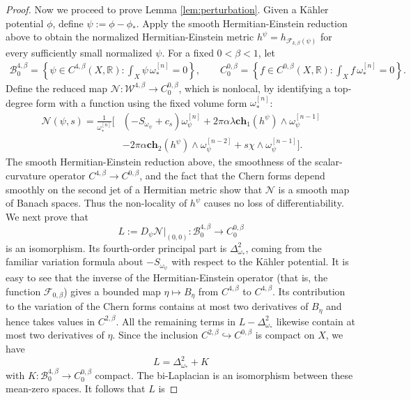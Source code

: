 \documentclass[10pt, letterpaper]{amsart}
\theoremstyle{plain}
\theoremstyle{definition}
\numberwithin{equation}{section}
\begin{document}
\begin{proof}
\indent Now we proceed to prove Lemma \ref{lem:perturbation}. Given a K\"ahler potential $\phi$, define $\psi:=\phi-\phi_*$.  Apply the smooth Hermitian-Einstein reduction above to obtain
the normalized Hermitian-Einstein metric $h^\psi=h_{\mathcal F_{k,\beta}(\psi)}$ for every sufficiently
small normalized $\psi$. For a fixed $0<\beta<1$, let
\begin{align*}
\mathcal B_0^{4,\beta}
=
\left\{\psi\in C^{4,\beta}(X,\mathbb R):
\int_X\psi\,\omega_*^{[n]}=0\right\},
\qquad
C_0^{0,\beta}
=
\left\{f\in C^{0,\beta}(X,\mathbb R):
\int_Xf\,\omega_*^{[n]}=0\right\}.
\end{align*}
Define the reduced map $\mathcal N: \mathcal{W}^{4,\beta} \rightarrow C_0^{0,\beta}$, which is nonlocal, by identifying a top-degree form with
a function using the fixed volume form $\omega_*^{[n]}$:
\begin{align}
\mathcal N(\psi,s)
=\frac{1}{\omega_*^{[n]}}\Big[&
\left(-S_{\omega_\psi}+c_s\right)\omega_\psi^{[n]}
+2\pi\alpha\lambda\mathbf{ch}_1(h^\psi)
\wedge\omega_\psi^{[n-1]}\nonumber\\
&-2\pi\alpha\mathbf{ch}_2(h^\psi)
\wedge\omega_\psi^{[n-2]}
+s\chi\wedge\omega_\psi^{[n-1]}
\Big].
\label{eq:reduced-twisted-map}
\end{align}
 The smooth Hermitian-Einstein reduction above, the
smoothness of the scalar-curvature operator
$C^{4,\beta}\to C^{0,\beta}$, and the fact that the Chern forms depend smoothly on the second jet of a Hermitian metric show that $\mathcal N$ is
a smooth map of Banach spaces.  Thus the non-locality of $h^\psi$ causes no loss of differentiability. 
We next prove that
\[
L:=D_\psi\mathcal N|_{(0,0)}:
\mathcal B_0^{4,\beta}\longrightarrow C_0^{0,\beta}
\]
is an isomorphism.  Its fourth-order principal part is $\Delta_{\omega_*}^2$,
coming from the familiar variation formula about $-S_{\omega_\psi}$ with respect to the K\"ahler potential. It is easy to see that the inverse of the Hermitian-Einstein operator (that is, the function $\mathcal F_{0,\beta}$) gives a bounded map
$\eta\mapsto B_\eta$ from $C^{4,\beta}$ to $C^{4,\beta}$.  Its contribution
to the variation of the Chern forms contains at most two derivatives of
$B_\eta$ and hence takes values in $C^{2,\beta}$.  All the remaining terms
in $L-\Delta_{\omega_*}^2$ likewise contain at most two derivatives of
$\eta$.  Since the inclusion $C^{2,\beta}\hookrightarrow C^{0,\beta}$ is
compact on $X$, we have
\[
L=\Delta_{\omega_*}^2+K
\]
with $K:\mathcal B_0^{4,\beta}\to C_0^{0,\beta}$ compact.  The bi-Laplacian
is an isomorphism between these mean-zero spaces.  It follows that $L$ is

\end{proof}
\end{document}
